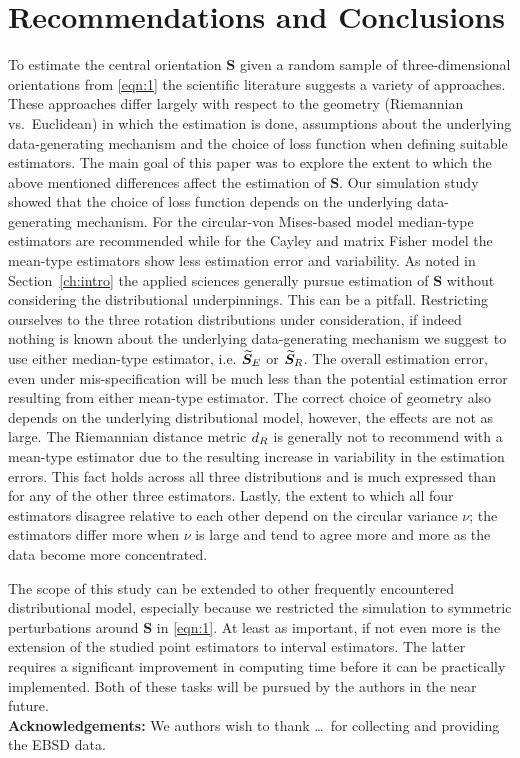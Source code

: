 \section{Recommendations and Conclusions}\label{sec:disc}

To estimate the central orientation $\bm S$ given a random sample of three-dimensional orientations from \eqref{eqn:1} the scientific literature suggests a variety of approaches. These approaches differ largely with respect to the geometry (Riemannian vs.~Euclidean) in which the estimation is done, assumptions about the underlying data-generating mechanism and the choice of loss function when defining suitable estimators. The main goal of this paper was to explore the extent to which the above mentioned differences affect the estimation of $\bm S$. 
Our simulation study showed that the choice of loss function depends on the underlying data-generating mechanism.  For the circular-von Mises-based model median-type estimators are recommended while for the Cayley and matrix Fisher model the mean-type estimators show less estimation error and variability. As noted in Section~\ref{ch:intro} the applied sciences generally pursue estimation of $\bm S$ without considering the distributional underpinnings. This can be a pitfall. Restricting ourselves to the three rotation distributions under consideration,  if indeed nothing is known about the underlying data-generating mechanism we suggest to use either median-type estimator, i.e. ${\widetilde{\bm S}_E}$ or ${\widetilde{\bm S}_R}$. The overall estimation error, even under mis-specification will be much less than the potential estimation error resulting from either mean-type estimator. The correct choice of geometry also depends on the underlying distributional model, however, the effects are not as large. The Riemannian distance metric  ${d_R}$ is generally not to recommend with a mean-type estimator due to the resulting increase in variability in the estimation errors. This fact holds across all three distributions  and is much expressed than for any of the other three estimators.
Lastly, the extent to which all four estimators disagree relative to each other depend on the circular variance $\nu$; the estimators differ more when $\nu$ is large and tend to agree more and more as the data become more concentrated.  
   
The scope of this study can be extended to other frequently encountered distributional model, especially because we restricted the simulation to symmetric perturbations around $\bm S$ in \eqref{eqn:1}. At least as important, if not even more is the extension of the studied point estimators to interval estimators. The latter requires a significant improvement in computing time before it can be practically implemented. Both of these tasks will be pursued by the authors in the near future.\\

\noindent \textbf{Acknowledgements:} We authors wish to thank \ldots \, for collecting and providing the EBSD data. 

